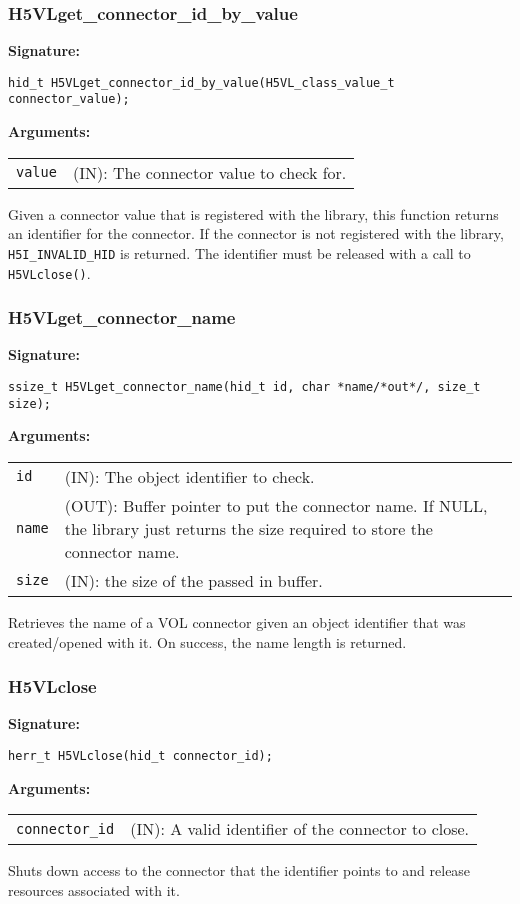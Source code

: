 \subsubsection{H5VLget\_connector\_id\_by\_value}
\begin{mdframed}[style=bgbox]
\textbf{Signature:}
\begin{lstlisting}
hid_t H5VLget_connector_id_by_value(H5VL_class_value_t connector_value);
\end{lstlisting}
\textbf{Arguments:}\\
\begin{tabular}{l p{13.5cm}}
  {\tt value} & (IN): The connector value to check for.\\
\end{tabular}
\end{mdframed}
Given a connector value that is registered with the library, this function returns an identifier for the connector. If the connector is not registered with the library, \texttt{H5I\_INVALID\_HID} is returned. The identifier must be released with a call to {\tt H5VLclose()}.
\bigskip


\subsubsection{H5VLget\_connector\_name}
\begin{mdframed}[style=bgbox]
\textbf{Signature:}
\begin{lstlisting}
ssize_t H5VLget_connector_name(hid_t id, char *name/*out*/, size_t size);
\end{lstlisting}
\textbf{Arguments:}\\
\begin{tabular}{l p{13.5cm}}
  {\tt id} & (IN): The object identifier to check.\\
  {\tt name} & (OUT): Buffer pointer to put the connector name. If NULL, the library just returns the size required to store the connector name.\\
  {\tt size} & (IN): the size of the passed in buffer.\\
\end{tabular}
\end{mdframed}
Retrieves the name of a VOL connector given an object identifier that was created/opened with it. On success, the name length is returned.
\bigskip


\subsubsection{H5VLclose}
\begin{mdframed}[style=bgbox]
\textbf{Signature:}
\begin{lstlisting}
herr_t H5VLclose(hid_t connector_id);
\end{lstlisting}
\textbf{Arguments:}\\
\begin{tabular}{l p{13.5cm}}
 {\tt connector\_id} & (IN): A valid identifier of the connector to close.\\
\end{tabular}
\end{mdframed}
Shuts down access to the connector that the identifier points to and release resources associated with it.
\bigskip


